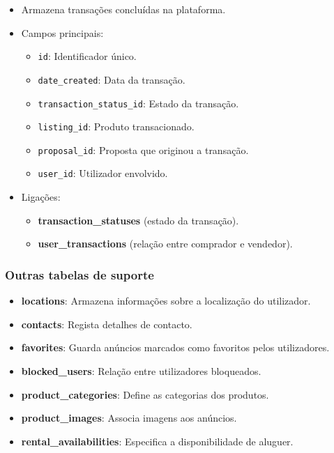 \documentclass[a4paper, 12pt]{article} %
\begin{document}
\begin{itemize}
    \item Armazena transações concluídas na plataforma.
    \item Campos principais:
    \begin{itemize}
        \item \verb|id|: Identificador único.
        \item \verb|date_created|: Data da transação.
        \item \verb|transaction_status_id|: Estado da transação.
        \item \verb|listing_id|: Produto transacionado.
        \item \verb|proposal_id|: Proposta que originou a transação.
        \item \verb|user_id|: Utilizador envolvido.
    \end{itemize}
    \item Ligações:
    \begin{itemize}
        \item \textbf{transaction\_statuses} (estado da transação).
        \item \textbf{user\_transactions} (relação entre comprador e vendedor).
    \end{itemize}
\end{itemize}

\subsubsection{\textbf{Outras tabelas de suporte}}

\begin{itemize}
    \item \textbf{locations}: Armazena informações sobre a localização do utilizador.
    \item \textbf{contacts}: Regista detalhes de contacto.
    \item \textbf{favorites}: Guarda anúncios marcados como favoritos pelos utilizadores.
    \item \textbf{blocked\_users}: Relação entre utilizadores bloqueados.
    \item \textbf{product\_categories}: Define as categorias dos produtos.
    \item \textbf{product\_images}: Associa imagens aos anúncios.
    \item \textbf{rental\_availabilities}: Especifica a disponibilidade de aluguer.
\end{itemize}
 
\end{document}

